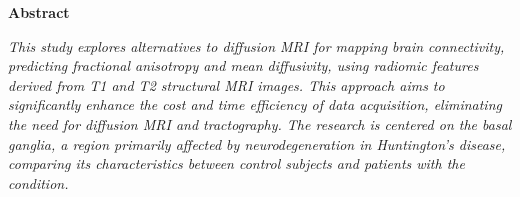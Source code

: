 \thispagestyle{plain}
\begin{center}
    \Large
    \textbf{Abstract}
\end{center}
\textit{This study explores alternatives to diffusion MRI for mapping brain connectivity, predicting fractional anisotropy and mean diffusivity, using radiomic features derived from T1 and T2 structural MRI images. This approach aims to significantly enhance the cost and time efficiency of data acquisition, eliminating the need for diffusion MRI and tractography. The research is centered on the basal ganglia, a region primarily affected by neurodegeneration in Huntington’s disease, comparing its characteristics between control subjects and patients with the condition.}